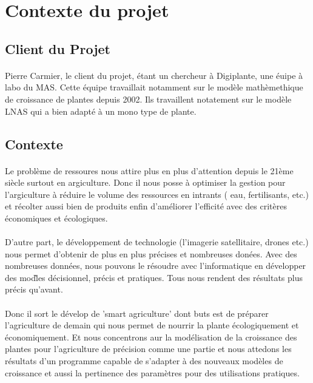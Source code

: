 \section{Contexte du projet}

\subsection{Client du Projet}
\paragraph{}
Pierre Carmier, le client du projet, \'etant un chercheur à Digiplante, une \'euipe à labo du MAS. Cette \'equipe travaillait notamment sur le mod\`ele math\`emethique de croissance de plantes depuis 2002. Ils travaillent notatement sur le mod\`ele LNAS qui a bien adapt\'e \`a un mono type de plante.
\subsection{Contexte}
\paragraph{}
Le probl\`eme de ressoures nous attire plus en plus d'attention depuis le 21\`eme si\`ecle surtout en argiculture. Donc il nous posse \`a optimiser la gestion pour l'argiculture \`a r\'eduire le volume des ressources en intrants ( eau, fertilisants, etc.) et r\'ecolter aussi bien de produits enfin d'am\'eliorer l'efficit\'e avec des crit\`eres \'economiques et \'ecologiques.
\paragraph{}
D'autre part, le d\'eveloppement de technologie (l'imagerie satellitaire, drones etc.) nous permet d'obtenir de plus en plus pr\'ecises et nombreuses don\'ees. Avec des nombreuses donn\'ees, nous pouvons le r\'esoudre avec l'informatique en d\'evelopper des mod\`les d\'ecisionnel, pr\'ecis et pratiques. Tous nous rendent des r\'esultats plus pr\'ecis qu'avant.
\paragraph{}
Donc il sort le d\'evelop de 'smart agriculture' dont buts est de pr\'eparer l'agriculture de demain qui nous permet de nourrir la plante \'ecologiquement et  \'economiquement. Et nous concentrons aur la mod\'elisation de la croissance des plantes pour l'agriculture de pr\'ecision comme une partie et nous attedons les r\'esultats d'un programme capable de s'adapter \`a des nouveaux mod\`eles de croissance et aussi la pertinence des param\`etres pour des utilisations pratiques. 

